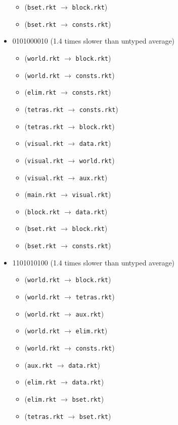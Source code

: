 \documentclass{article}
\newcommand{\mono}[1]{\texttt{#1}}
\begin{document}
\begin{itemize}
\begin{itemize}
  \item (\mono{bset.rkt} $\rightarrow$ \mono{block.rkt})
  \item (\mono{bset.rkt} $\rightarrow$ \mono{consts.rkt})
  \end{itemize}
\item 0101000010 (1.4 times slower than untyped average)
  \begin{itemize}
  \item (\mono{world.rkt} $\rightarrow$ \mono{block.rkt})
  \item (\mono{world.rkt} $\rightarrow$ \mono{consts.rkt})
  \item (\mono{elim.rkt} $\rightarrow$ \mono{consts.rkt})
  \item (\mono{tetras.rkt} $\rightarrow$ \mono{consts.rkt})
  \item (\mono{tetras.rkt} $\rightarrow$ \mono{block.rkt})
  \item (\mono{visual.rkt} $\rightarrow$ \mono{data.rkt})
  \item (\mono{visual.rkt} $\rightarrow$ \mono{world.rkt})
  \item (\mono{visual.rkt} $\rightarrow$ \mono{aux.rkt})
  \item (\mono{main.rkt} $\rightarrow$ \mono{visual.rkt})
  \item (\mono{block.rkt} $\rightarrow$ \mono{data.rkt})
  \item (\mono{bset.rkt} $\rightarrow$ \mono{block.rkt})
  \item (\mono{bset.rkt} $\rightarrow$ \mono{consts.rkt})
  \end{itemize}
\item 1101010100 (1.4 times slower than untyped average)
  \begin{itemize}
  \item (\mono{world.rkt} $\rightarrow$ \mono{block.rkt})
  \item (\mono{world.rkt} $\rightarrow$ \mono{tetras.rkt})
  \item (\mono{world.rkt} $\rightarrow$ \mono{aux.rkt})
  \item (\mono{world.rkt} $\rightarrow$ \mono{elim.rkt})
  \item (\mono{world.rkt} $\rightarrow$ \mono{consts.rkt})
  \item (\mono{aux.rkt} $\rightarrow$ \mono{data.rkt})
  \item (\mono{elim.rkt} $\rightarrow$ \mono{data.rkt})
  \item (\mono{elim.rkt} $\rightarrow$ \mono{bset.rkt})
  \item (\mono{tetras.rkt} $\rightarrow$ \mono{bset.rkt})

\end{itemize}
\end{itemize}
\end{document}

